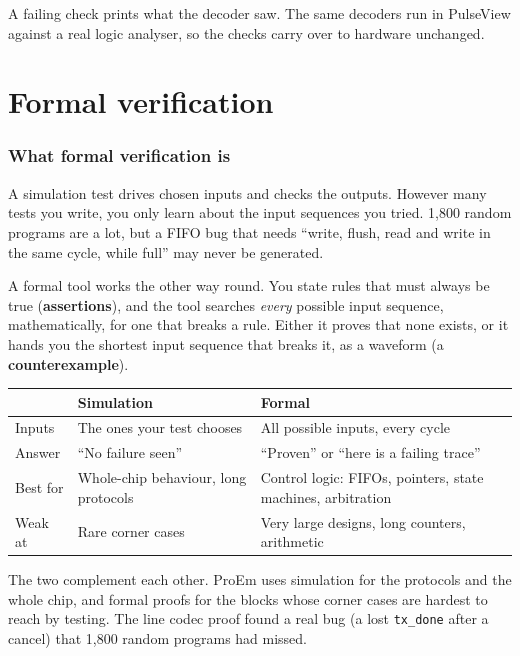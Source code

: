 \documentclass[11pt,a4paper]{article}
\begin{document}
A failing check prints what the decoder saw. The same decoders run in PulseView against a real logic analyser, so the checks carry over to hardware unchanged.

\part{Formal verification}\label{part:formal}

\section{What formal verification is}

A simulation test drives chosen inputs and checks the outputs. However many tests you write, you only learn about the input sequences you tried. 1,800 random programs are a lot, but a FIFO bug that needs ``write, flush, read and write in the same cycle, while full'' may never be generated.

A formal tool works the other way round. You state rules that must always be true (\textbf{assertions}), and the tool searches \emph{every} possible input sequence, mathematically, for one that breaks a rule. Either it proves that none exists, or it hands you the shortest input sequence that breaks it, as a waveform (a \textbf{counterexample}).

\begin{center}
\begin{tabularx}{\linewidth}{@{}lLL@{}}
\toprule
 & Simulation & Formal \\
\midrule
Inputs & The ones your test chooses & All possible inputs, every cycle \\
Answer & ``No failure seen'' & ``Proven'' or ``here is a failing trace'' \\
Best for & Whole-chip behaviour, long protocols & Control logic: FIFOs, pointers, state machines, arbitration \\
Weak at & Rare corner cases & Very large designs, long counters, arithmetic \\
\bottomrule
\end{tabularx}
\end{center}

The two complement each other. ProEm uses simulation for the protocols and the whole chip, and formal proofs for the blocks whose corner cases are hardest to reach by testing. The line codec proof found a real bug (a lost \texttt{tx\_done} after a cancel) that 1,800 random programs had missed.
\end{document}
